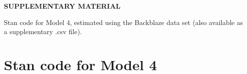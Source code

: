 \documentclass[12pt]{article}
\begin{document}
\def\spacingset#1{\renewcommand{\baselinestretch}%
{#1}\small\normalsize} \spacingset{1}

\begin{center}
{\large\bf SUPPLEMENTARY MATERIAL}
\end{center}

\begin{description}

\item Stan code for Model 4, estimated using the Backblaze data set (also available as a supplementary .csv file).

\end{description}

\section{Stan code for Model 4}
\label{sec:stan-code}
\end{document}

